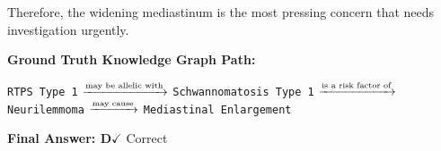 \documentclass{article}
\theoremstyle{plain}
\theoremstyle{definition}
\theoremstyle{remark}
\begin{document}
\begin{tcolorbox}
\begin{tcolorbox}
        Therefore, the \colorbox{pathhighlight}{widening mediastinum} is the most pressing concern that needs investigation urgently.
    \end{tcolorbox}

    \vspace{0.2cm}
\begin{tcolorbox}[
    colback=truepathback,
    colframe=green!50!black,
    boxrule=0.5pt,
    left=2mm, right=2mm, top=1.5mm, bottom=1.5mm
]
    \footnotesize 
    \textbf{Ground Truth Knowledge Graph Path:}
    
    \vspace{0.2cm}
    \centering
    \scriptsize
    \texttt{\colorbox{pathhighlight}{RTPS Type 1}} 
    $\xrightarrow{\text{\tiny may be allelic with}}$ 
    \texttt{\colorbox{pathhighlight}{Schwannomatosis Type 1}}
    $\xrightarrow{\text{\tiny is a risk factor of}}$ 
    \texttt{\colorbox{pathhighlight}{Neurilemmoma}} 
    $\xrightarrow{\text{\tiny may cause}}$ 
    \texttt{\colorbox{pathhighlight}{Mediastinal Enlargement}}
\end{tcolorbox}

    \vspace{0.1cm}
    \textbf{Final Answer: \color{medicalblue}D}\quad \textcolor{green!70!black}{$\checkmark$ Correct}
\end{tcolorbox}



\end{document}
